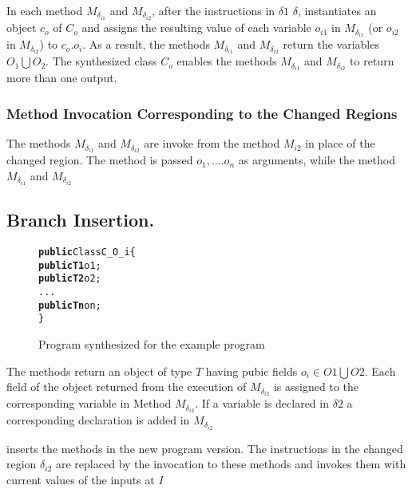 In each method $M_{\delta_{i1}}$ and $M_{\delta_{i2}}$, after the instructions in $\delta1$ $\delta$,
 instantiates an object $c_o$ of $C_o$ and assigns the resulting value of each variable $o_{i1}$ in $M_{\delta_{i1}}$ (or $o_{i2}$ in $M_{\delta_{i2}}$) to $c_o.o_i$. 
As a result, the methods 
$M_{\delta_{i1}}$ and $M_{\delta_{i2}}$ return the variables $O_1 \bigcup O_2$. The synthesized class $C_o$
enables the methods $M_{\delta_{i1}}$ and $M_{\delta_{i2}}$ to return more than one output.

\subsubsection{Method Invocation Corresponding to the Changed Regions} 
The methods $M_{\delta_{i1}}$ and $M_{\delta_{i2}}$ are invoke from the method $M_{i2}$ in place of the changed region.
The method is passed $o_1,....o_n$ as arguments, while the method $M_{\delta_{i1}}$ and $M_{\delta_{i2}}$ 

\subsection{Branch Insertion.}


\begin{figure}[t]
\begin{CodeOut}
\begin{alltt}
  \textbf{public} Class C_{O_i}\{
  \hspace{0.5cm}\textbf{public T1} o1;
  \hspace{0.5cm}\textbf{public T2} o2;
  \hspace{0.5cm}...
  \hspace{0.5cm}\textbf{public Tn} on; 
\}
  
\end{alltt}
\end{CodeOut}
\vspace{-0.15 in}
\caption{Program synthesized for the example program}
\label{fig:Changed}
\end{figure}



The methods return an object of type $T$ having pubic fields $o_i \in O1 \bigcup O2$.
Each field of the object returned from the execution of $M_{\delta_{i2}}$ is assigned 
to the corresponding variable in Method $M_{\delta_{i2}}$. If a variable is declared in $\delta2$ a corresponding declaration is added in $M_{\delta_{i2}}$

 inserts the methods in the new program version.
The instructions in the changed region $\delta_{i2}$ are replaced by the 
invocation to these methods and invokes them with current values of the inputs at $I$


